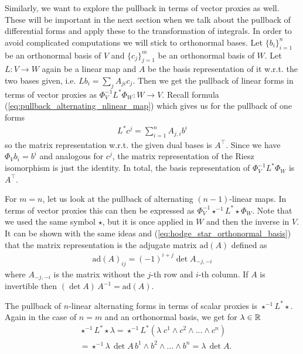 \documentclass[../master_thesis.tex]{subfiles}
\begin{document}
Similarly, we want to explore the pullback in terms of vector proxies as well. 
These will be important in the next section when we talk about the pullback 
of differential forms and apply these to the transformation of integrals.
In order to avoid complicated computations we will stick to orthonormal bases.
Let $\{ b_i \}_{i=1}^n$ be an orthonormal basis of $V$ and 
$\{ c_j \}_{j=1}^m$ be an orthonormal basis of $W$. Let $L : V \rightarrow W$ 
again be a linear map and $A$ be the basis representation of it w.r.t. 
the two bases given, i.e. $L b_i = \sum_j A_{ji} c_j$. 
Then we get the pullback of linear forms in terms 
of vector proxies 
as $\Phi_V^{-1} L^* \Phi_W : W \rightarrow V$. Recall 
formula (\ref{eq:pullback_alternating_nlinear_map}) which 
gives us for the pullback of one forms 
\begin{align}
    L^* c^j = \sum_{i=1}^n A_{j,i} b^i \label{eq:pullback_linear_forms}
\end{align}
so the matrix representation w.r.t. the given dual bases is $A^\top$.
Since we have $\Phi_V b_i = b^i$ and analogous for $c^j$,
the matrix representation of the Riesz isomorphism is just the identity.
In total, the basis representation of $\Phi_V^{-1} L^* \Phi_W$ is 
$A^\top$.

For $m=n$, let us look at the pullback of alternating $(n-1)$-linear maps.
In terms of vector proxies this can then be expressed as 
$\Phi_V^{-1} \star^{-1} L^* \star \Phi_W$. Note that we used the same symbol 
$\star$, but it is once applied in $W$ and then the inverse in $V$. It 
can be shown with the same ideas and (\ref{eq:hodge_star_orthonormal_basis})
that the matrix representation is the adjugate matrix 
$\text{ad}(A)$ defined as 
\begin{align*}
    \text{ad}(A)_{ij} = (-1)^{i+j} \det A_{-j,-i}
\end{align*} 
where $A_{-j,-i}$ is the matrix without the $j$-th row and $i$-th column.
If $A$ is invertible then $(\det A)\,A^{-1} =  \text{ad}(A)$. 

The pullback of $n$-linear alternating forms in terms of scalar proxies is 
$\star^{-1} L^* \star$. Again in the case of $n=m$ and an 
orthonormal basis, we get for $\lambda \in \mathbb{R}$
\begin{align*}
    &\star^{-1} L^* \star \lambda = \star^{-1} L^* (\lambda \; c^1 \wedge c^2 \wedge ... \wedge c^n)
    \\ &= \star^{-1} \lambda\,\det A \,b^1 \wedge b^2 \wedge ... \wedge b^n = \lambda\,\det A.
\end{align*}
\end{document}
